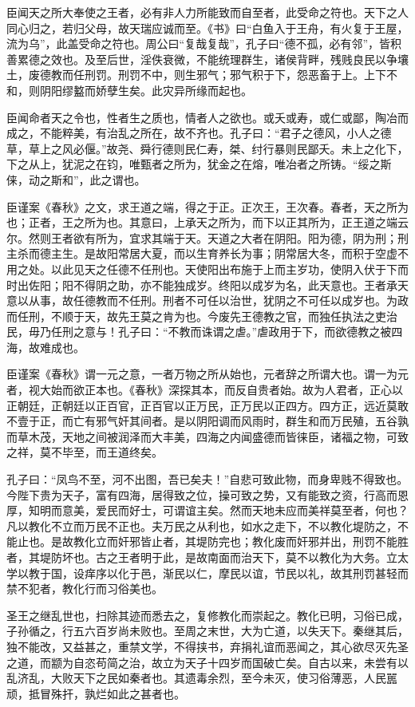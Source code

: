 \documentclass[UTF8,titlepage,oneside]{ctexbook}
\begin{document}
臣闻天之所大奉使之王者，必有非人力所能致而自至者，此受命之符也。天下之人同心归之，若归父母，故天瑞应诚而至。《书》曰“白鱼入于王舟，有火复于王屋，流为乌”，此盖受命之符也。周公曰“复哉复哉”，孔子曰“德不孤，必有邻”，皆积善累德之效也。及至后世，淫佚衰微，不能统理群生，诸侯背畔，残贱良民以争壤土，废德教而任刑罚。刑罚不中，则生邪气；邪气积于下，怨恶畜于上。上下不和，则阴阳缪盭而娇孽生矣。此灾异所缘而起也。

臣闻命者天之令也，性者生之质也，情者人之欲也。或夭或寿，或仁或鄙，陶冶而成之，不能粹美，有治乱之所在，故不齐也。孔子曰：“君子之德风，小人之德草，草上之风必偃。”故尧、舜行德则民仁寿，桀、纣行暴则民鄙夭。未上之化下，下之从上，犹泥之在钧，唯甄者之所为，犹金之在熔，唯冶者之所铸。“绥之斯俫，动之斯和”，此之谓也。

臣谨案《春秋》之文，求王道之端，得之于正。正次王，王次春。春者，天之所为也；正者，王之所为也。其意曰，上承天之所为，而下以正其所为，正王道之端云尔。然则王者欲有所为，宜求其端于天。天道之大者在阴阳。阳为德，阴为刑；刑主杀而德主生。是故阳常居大夏，而以生育养长为事；阴常居大冬，而积于空虚不用之处。以此见天之任德不任刑也。天使阳出布施于上而主岁功，使阴入伏于下而时出佐阳；阳不得阴之助，亦不能独成岁。终阳以成岁为名，此天意也。王者承天意以从事，故任德教而不任刑。刑者不可任以治世，犹阴之不可任以成岁也。为政而任刑，不顺于天，故先王莫之肯为也。今废先王德教之官，而独任执法之吏治民，毋乃任刑之意与！孔子曰：“不教而诛谓之虐。”虐政用于下，而欲德教之被四海，故难成也。

臣谨案《春秋》谓一元之意，一者万物之所从始也，元者辞之所谓大也。谓一为元者，视大始而欲正本也。《春秋》深探其本，而反自贵者始。故为人君者，正心以正朝廷，正朝廷以正百官，正百官以正万民，正万民以正四方。四方正，远近莫敢不壹于正，而亡有邪气奸其间者。是以阴阳调而风雨时，群生和而万民殖，五谷孰而草木茂，天地之间被润泽而大丰美，四海之内闻盛德而皆徕臣，诸福之物，可致之祥，莫不毕至，而王道终矣。

孔子曰：“凤鸟不至，河不出图，吾已矣夫！”自悲可致此物，而身卑贱不得致也。今陛下贵为天子，富有四海，居得致之位，操可致之势，又有能致之资，行高而恩厚，知明而意美，爱民而好士，可谓谊主矣。然而天地未应而美祥莫至者，何也？凡以教化不立而万民不正也。夫万民之从利也，如水之走下，不以教化堤防之，不能止也。是故教化立而奸邪皆止者，其堤防完也；教化废而奸邪并出，刑罚不能胜者，其堤防坏也。古之王者明于此，是故南面而治天下，莫不以教化为大务。立太学以教于国，设痒序以化于邑，渐民以仁，摩民以谊，节民以礼，故其刑罚甚轻而禁不犯者，教化行而习俗美也。

圣王之继乱世也，扫除其迹而悉去之，复修教化而崇起之。教化已明，习俗已成，子孙循之，行五六百岁尚未败也。至周之末世，大为亡道，以失天下。秦继其后，独不能改，又益甚之，重禁文学，不得挟书，弃捐礼谊而恶闻之，其心欲尽灭先圣之道，而颛为自恣苟简之治，故立为天子十四岁而国破亡矣。自古以来，未尝有以乱济乱，大败天下之民如秦者也。其遗毒余烈，至今未灭，使习俗薄恶，人民嚚顽，抵冒殊扞，孰烂如此之甚者也。
\end{document}

